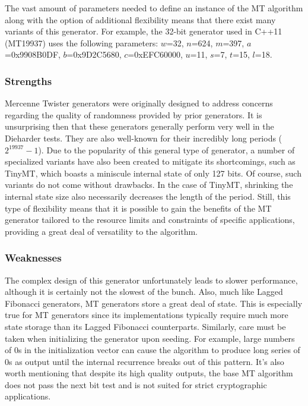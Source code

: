 The vast amount of parameters needed to define an instance of the MT algorithm along with the option of additional flexibility means that there exist many variants of this generator. For example, the 32-bit generator used in C++11 (MT19937) uses the following parameters: $w$=32, $n$=624, $m$=397, $a$=0x9908B0DF, $b$=0x9D2C5680, $c$=0xEFC60000, $u$=11, $s$=7, $t$=15, $l$=18.

\subsubsection{Strengths}
Mercenne Twister generators were originally designed to address concerns regarding the quality of randomness provided by prior generators. It is unsurprising then that these generators generally perform very well in the Dieharder tests. They are also well-known for their incredibly long periods ($2^{19937}-1$). Due to the popularity of this general type of generator, a number of specialized variants have also been created to mitigate its shortcomings, such as TinyMT, which boasts a miniscule internal state of only 127 bits. Of course, such variants do not come without drawbacks. In the case of TinyMT, shrinking the internal state size also necessarily decreases the length of the period. Still, this type of flexibility means that it is possible to gain the benefits of the MT generator tailored to the resource limits and constraints of specific applications, providing a great deal of versatility to the algorithm.

\subsubsection{Weaknesses}
The complex design of this generator unfortunately leads to slower performance, although it is certainly not the slowest of the bunch. Also, much like Lagged Fibonacci generators, MT generators store a great deal of state. This is especially true for MT generators since its implementations typically require much more state storage than its Lagged Fibonacci counterparts. Similarly, care must be taken when initializing the generator upon seeding. For example, large numbers of 0s in the initialization vector can cause the algorithm to produce long series of 0s as output until the internal recurrence breaks out of this pattern. It's also worth mentioning that despite its high quality outputs, the base MT algorithm does not pass the next bit test and is not suited for strict cryptographic applications.
